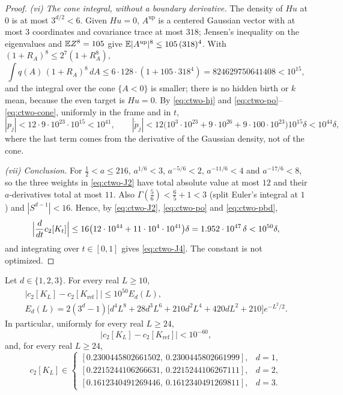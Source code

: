 \begin{proof}
\emph{(vi) The cone integral, without a boundary derivative.} The density of $Hu$ at $0$ is at most $3^{d/2}<6$. Given $Hu=0$, $A^{\mathrm{up}}$ is a centered Gaussian vector with at most $3$ coordinates and covariance trace at most $318$; Jensen's inequality on the eigenvalues and $\mathbb E Z^8=105$ give $\mathbb E|A^{\mathrm{up}}|^8\le105\,(318)^4$. With $(1+R_A)^8\le2^7(1+R_A^8)$,
\begin{equation}\label{eq:ctwo-cone}
\int q(A)\,(1+R_A)^8\,dA\le6\cdot128\cdot(1+105\cdot318^4)=824629750641408<10^{15},
\end{equation}
and the integral over the cone $\{A<0\}$ is smaller; there is no hidden birth or $k$ mean, because the even target is $Hu=0$. By \eqref{eq:ctwo-hj} and \eqref{eq:ctwo-po}--\eqref{eq:ctwo-cone}, uniformly in the frame and in $t$,
\begin{equation}\label{eq:ctwo-pbd}
|p_j|<12\cdot9\cdot10^{23}\cdot10^{15}<10^{41},\qquad |\dot p_j|<12\bigl(10^3\cdot10^{23}+9\cdot10^{26}+9\cdot100\cdot10^{23}\bigr)10^{15}\delta<10^{44}\delta,
\end{equation}
where the last term comes from the derivative of the Gaussian density, not of the cone.

\emph{(vii) Conclusion.} For $\frac12<a\le216$, $a^{1/6}<3$, $a^{-5/6}<2$, $a^{-11/6}<4$ and $a^{-17/6}<8$, so the three weights in \eqref{eq:ctwo-J2} have total absolute value at most $12$ and their $a$-derivatives total at most $11$. Also $\Gamma(\frac56)<\frac65+1<3$ (split Euler's integral at $1$) and $|S^{d-1}|<16$. Hence, by \eqref{eq:ctwo-J2}, \eqref{eq:ctwo-po} and \eqref{eq:ctwo-pbd},
\begin{equation}\label{eq:ctwo-cdot}
\Bigl|\frac d{dt}c_2[K_t]\Bigr|\le16\bigl(12\cdot10^{44}+11\cdot10^4\cdot10^{41}\bigr)\delta=1.952\cdot10^{47}\,\delta<10^{50}\delta,
\end{equation}
and integrating over $t\in[0,1]$ gives \eqref{eq:ctwo-J4}. The constant is not optimized.
\end{proof}

\begin{corollary}\label{cor:ctwo-torus}
Let $d\in\{1,2,3\}$. For every real $L\ge10$,
\begin{equation}\label{eq:ctwo-J5}
\begin{gathered}
\bigl|c_2[K_L]-c_2[K_{\mathrm{ref}}]\bigr|\le10^{50}E_d(L),\\
E_d(L)=2(3^d-1)\bigl[d^4L^8+28d^3L^6+210d^2L^4+420dL^2+210\bigr]e^{-L^2/2}.
\end{gathered}
\end{equation}
In particular, uniformly for every real $L\ge24$,
\begin{equation}\label{eq:ctwo-J6}
\bigl|c_2[K_L]-c_2[K_{\mathrm{ref}}]\bigr|<10^{-60},
\end{equation}
and, for every real $L\ge24$,
\[
c_2[K_L]\in
\begin{cases}
[0.2300445802661502,\ 0.2300445802661999], & d=1,\\
[0.2215244106266631,\ 0.2215244106267111], & d=2,\\
[0.1612340491269446,\ 0.1612340491269811], & d=3.
\end{cases}
\]
\end{corollary}


